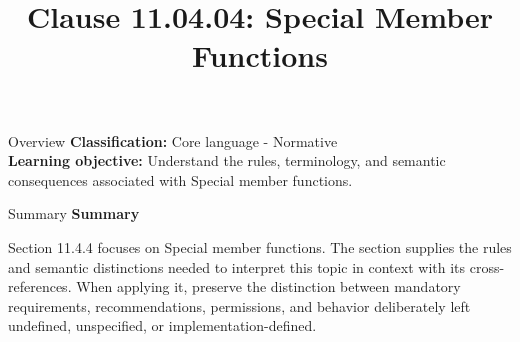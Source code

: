 \documentclass[10pt,letterpaper]{article}
\title{Clause 11.04.04: Special Member Functions}
\author{}
\date{}
\begin{document}
\maketitle
\begin{CornellOverviewBox}{Overview}
\textbf{Classification:} Core language - Normative\\[2pt]
\textbf{Learning objective:} Understand the rules, terminology, and semantic consequences associated with Special member functions.
\end{CornellOverviewBox}\begin{CornellSummaryBox}{Summary}
{\sffamily\bfseries\color{Accent} Summary}\par\vspace{3pt}Section 11.4.4 focuses on Special member functions. The section supplies the rules and semantic distinctions needed to interpret this topic in context with its cross-references. When applying it, preserve the distinction between mandatory requirements, recommendations, permissions, and behavior deliberately left undefined, unspecified, or implementation-defined.
\end{CornellSummaryBox}
\end{document}
